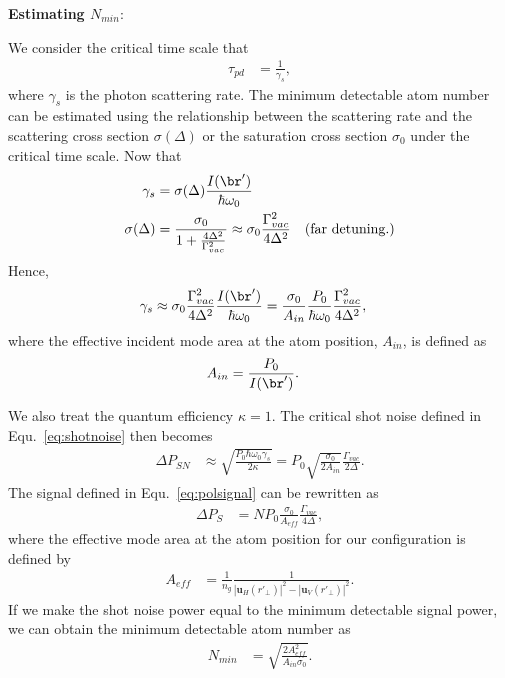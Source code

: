\documentclass[]{report}
\begin{document}
\textbf{Estimating $ N_{min} $}:

We consider the critical time scale that 
\begin{align}
\tau_{pd} &= \frac{1}{\gamma_s},
\end{align}
where $ \gamma_{s} $ is the photon scattering rate. The minimum detectable atom number can be estimated using the relationship between the scattering rate and the scattering cross section $ \sigma(\Delta) $ or the saturation cross section $ \sigma_0 $ under the critical time scale. Now that
\begin{align}
\gamma_s &= \sigma(\Delta) \frac{I(\br')}{\hbar \omega_0} \\
\sigma(\Delta) &=\frac{\sigma_0}{1+\frac{4\Delta^2}{\Gamma^2_{vac}}}\approx \sigma_0 \frac{\Gamma_{vac}^2}{4\Delta^2} \quad \text{(far detuning.)}
\end{align}
Hence,
\begin{align}
\gamma_s &\approx \sigma_0\frac{\Gamma_{vac}^2}{4\Delta^2} \frac{I(\br')}{\hbar \omega_0}=\frac{\sigma_0}{A_{in}}\frac{P_0}{\hbar\omega_0}\frac{\Gamma_{vac}^2}{4\Delta^2},
\end{align}
where the effective incident mode area at the atom position, $A_{in}  $, is defined as
\begin{align}
A_{in }&= \frac{P_0}{I(\br')}.
\end{align}

We also treat the quantum efficiency $ \kappa=1 $. The critical shot noise defined in Equ.~\eqref{eq:shotnoise} then becomes
\begin{align}
\Delta P_{SN} &\approx \sqrt{\frac{P_0 \hbar \omega_0 \gamma_s}{2\kappa }} =P_0\sqrt{\frac{ \sigma_0 }{2A_{in}}}\frac{\Gamma_{vac}}{2\Delta}.
\end{align}
The signal defined in Equ.~\eqref{eq:polsignal} can be rewritten as
\begin{align}
\Delta P_S &= NP_0 \frac{\sigma_0}{A_{e\!f\!f}}\frac{\Gamma_{vac}}{4\Delta},
\end{align}
where the effective mode area at the atom position for our configuration is defined by
\begin{align}
A_{e\!f\!f} &= \frac{1}{n_g}\frac{1}{| \mathbf{u}_H(r'_{\!\perp})|^2- | \mathbf{u}_V(r'_{\!\perp})|^2}.
\end{align}
If we make the shot noise power equal to the minimum detectable signal power, we can obtain the minimum detectable atom number as
\begin{align}
N_{min} &= \sqrt{\frac{2A_{e\!f\!f}^2}{A_{in}\sigma_0}}.
\end{align}
\end{document}
